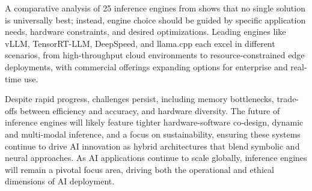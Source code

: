 \documentclass[12pt,a4paper]{article}
\begin{document}
A comparative analysis of 25 inference engines from \cite{park2025} shows that no single solution is universally best; instead, engine choice should be guided by specific application needs, hardware constraints, and desired optimizations. Leading engines like vLLM, TensorRT-LLM, DeepSpeed, and llama.cpp each excel in different scenarios, from high-throughput cloud environments to resource-constrained edge deployments, with commercial offerings expanding options for enterprise and real-time use.

Despite rapid progress, challenges persist, including memory bottlenecks, trade-offs between efficiency and accuracy, and hardware diversity. The future of inference engines will likely feature tighter hardware-software co-design, dynamic and multi-modal inference, and a focus on sustainability, ensuring these systems continue to drive AI innovation as hybrid architectures that blend symbolic and neural approaches. As AI applications continue to scale globally, inference engines will remain a pivotal focus area, driving both the operational and ethical dimensions of AI deployment.

\renewcommand{\refname}{}
\end{document}
